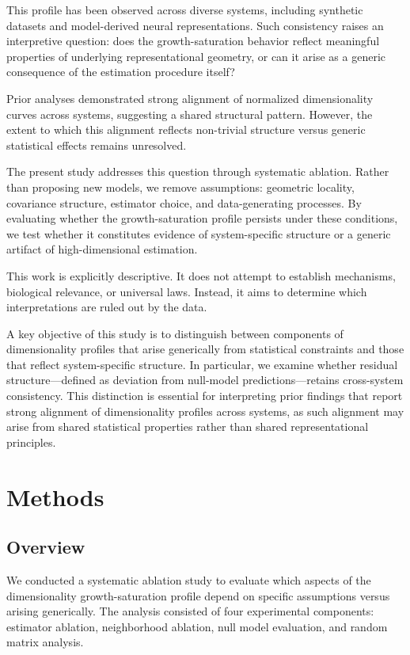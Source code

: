 This profile has been observed across diverse systems, including synthetic datasets and model-derived neural representations. Such consistency raises an interpretive question: does the growth-saturation behavior reflect meaningful properties of underlying representational geometry, or can it arise as a generic consequence of the estimation procedure itself?

Prior analyses demonstrated strong alignment of normalized dimensionality curves across systems, suggesting a shared structural pattern. However, the extent to which this alignment reflects non-trivial structure versus generic statistical effects remains unresolved.

The present study addresses this question through systematic ablation. Rather than proposing new models, we remove assumptions: geometric locality, covariance structure, estimator choice, and data-generating processes. By evaluating whether the growth-saturation profile persists under these conditions, we test whether it constitutes evidence of system-specific structure or a generic artifact of high-dimensional estimation.

This work is explicitly descriptive. It does not attempt to establish mechanisms, biological relevance, or universal laws. Instead, it aims to determine which interpretations are ruled out by the data.

A key objective of this study is to distinguish between components of dimensionality profiles that arise generically from statistical constraints and those that reflect system-specific structure. In particular, we examine whether residual structure---defined as deviation from null-model predictions---retains cross-system consistency. This distinction is essential for interpreting prior findings that report strong alignment of dimensionality profiles across systems, as such alignment may arise from shared statistical properties rather than shared representational principles.

\section{Methods}

\subsection{Overview}

We conducted a systematic ablation study to evaluate which aspects of the dimensionality growth-saturation profile depend on specific assumptions versus arising generically. The analysis consisted of four experimental components: estimator ablation, neighborhood ablation, null model evaluation, and random matrix analysis.

